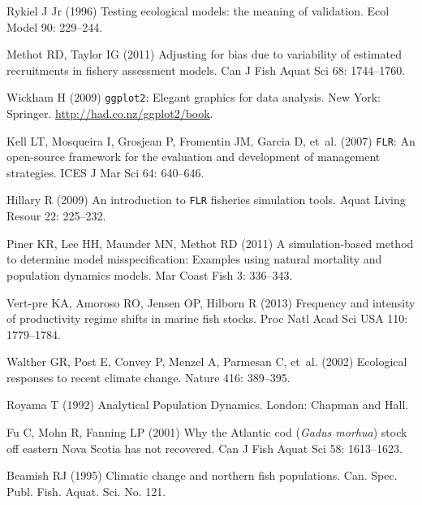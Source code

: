 \documentclass[12pt]{article}
\begin{document}
\begin{thebibliography}{10}
Rykiel J Jr (1996) Testing ecological models: the meaning of validation.
\newblock Ecol Model 90: 229--244.

Methot RD, Taylor IG (2011) Adjusting for bias due to variability of estimated
  recruitments in fishery assessment models.
\newblock Can J Fish Aquat Sci 68: 1744--1760.

Wickham H (2009) \texttt{ggplot2}: Elegant graphics for data analysis.
\newblock New York: Springer.
\newblock \urlprefix\url{http://had.co.nz/ggplot2/book}.

Kell LT, Mosqueira I, Grosjean P, Fromentin JM, Garcia D, et~al. (2007)
  \texttt{{FLR}}: An open-source framework for the evaluation and development
  of management strategies.
\newblock ICES J Mar Sci 64: 640--646.

Hillary R (2009) An introduction to \texttt{{FLR}} fisheries simulation tools.
\newblock Aquat Living Resour 22: 225--232.

Piner KR, Lee HH, Maunder MN, Methot RD (2011) A simulation-based method to
  determine model misspecification: Examples using natural mortality and
  population dynamics models.
\newblock Mar Coast Fish 3: 336--343.

Vert-pre KA, Amoroso RO, Jensen OP, Hilborn R (2013) Frequency and intensity of
  productivity regime shifts in marine fish stocks.
\newblock Proc Natl Acad Sci USA 110: 1779--1784.

Walther GR, Post E, Convey P, Menzel A, Parmesan C, et~al. (2002) Ecological
  responses to recent climate change.
\newblock Nature 416: 389--395.

Royama T (1992) Analytical Population Dynamics.
\newblock London: Chapman and Hall.

Fu C, Mohn R, Fanning LP (2001) Why the {Atlantic cod} (\textit{Gadus morhua})
  stock off eastern {Nova Scotia} has not recovered.
\newblock Can J Fish Aquat Sci 58: 1613--1623.

Beamish RJ (1995) Climatic change and northern fish populations.
\newblock Can. Spec. Publ. Fish. Aquat. Sci. No. 121.


\end{thebibliography}
\end{document}
